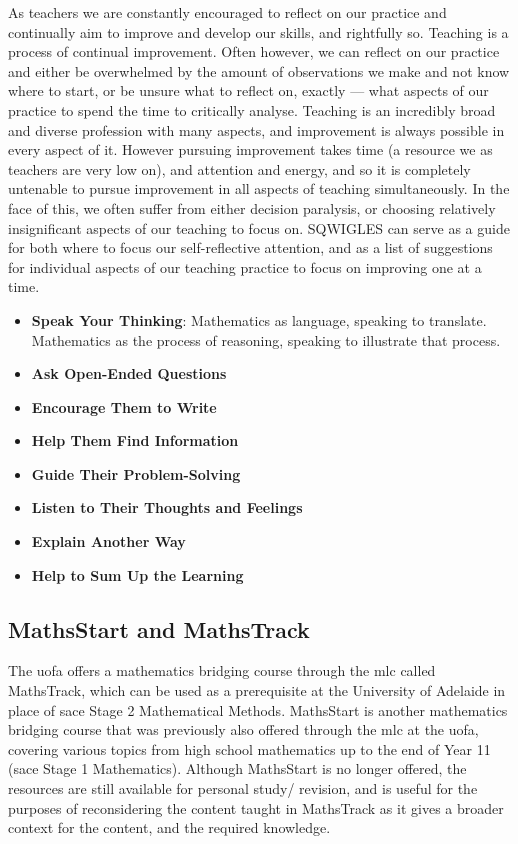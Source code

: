 \documentclass[twoside,12pt,a4paper]{report}
\begin{document}
As teachers we are constantly encouraged to reflect on our practice and continually aim to improve and develop our skills, and rightfully so. Teaching is a process of continual improvement. Often however, we can reflect on our practice and either be overwhelmed by the amount of observations we make and not know where to start, or be unsure what to reflect on, exactly --- what aspects of our practice to spend the time to critically analyse. Teaching is an incredibly broad and diverse profession with many aspects, and improvement is always possible in every aspect of it. However pursuing improvement takes time (a resource we as teachers are very low on), and attention and energy, and so it is completely untenable to pursue improvement in all aspects of teaching simultaneously. In the face of this, we often suffer from either decision paralysis, or choosing relatively insignificant aspects of our teaching to focus on. SQWIGLES can serve as a guide for both where to focus our self-reflective attention, and as a list of suggestions for individual aspects of our teaching practice to focus on improving one at a time.

\begin{itemize}
	\item \textbf{Speak Your Thinking}: Mathematics as language, speaking to translate. Mathematics as the process of reasoning, speaking to illustrate that process.
	\item \textbf{Ask Open-Ended Questions}
	\item \textbf{Encourage Them to Write}
	\item \textbf{Help Them Find Information}
	\item \textbf{Guide Their Problem-Solving}
	\item \textbf{Listen to Their Thoughts and Feelings}
	\item \textbf{Explain Another Way}
	\item \textbf{Help to Sum Up the Learning}
\end{itemize}





\subsection{MathsStart and MathsTrack}

The \gls{uofa} offers a mathematics bridging course through the \gls{mlc} called MathsTrack, which can be used as a prerequisite at the University of Adelaide in place of \gls{sace} Stage 2 Mathematical Methods. MathsStart is another mathematics bridging course that was previously also offered through the \gls{mlc} at the \gls{uofa}, covering various topics from high school mathematics up to the end of Year 11 (\gls{sace} Stage 1 Mathematics). Although MathsStart is no longer offered, the resources are still available for personal study/ revision, and is useful for the purposes of reconsidering the content taught in MathsTrack as it gives a broader context for the content, and the required knowledge.
\end{document}
